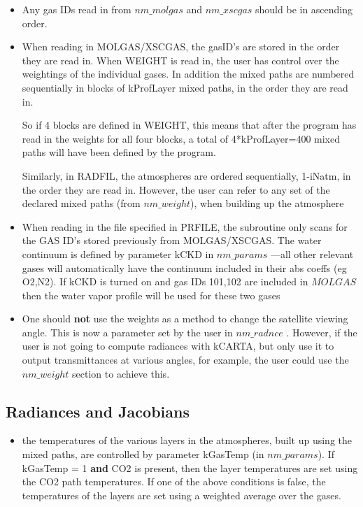 \documentclass[12pt]{article}
\newcommand{\kc}{\textsf{kCARTA}\xspace}
\begin{document}
{{{\begin{itemize}
\item Any gas IDs read in from $nm\_molgas$ and $nm\_xscgas$ should be in
  ascending order.
  
\item When reading in MOLGAS/XSCGAS, the gasID's are stored in the
  order they are read in.  When WEIGHT is read in, the user has
  control over the weightings of the individual gases.  In addition
  the mixed paths are numbered sequentially in blocks of
  kProfLayer mixed paths, in the order they are read in.  

  So if 4 blocks are defined in WEIGHT, this means that after the
  program has read in the weights for all four blocks, a total of
  4*kProfLayer=400 mixed paths will have been defined by the program.
  
  Similarly, in RADFIL, the atmospheres are ordered sequentially,
  1-{\sf iNatm}, in the order they are read in.  However, the user
  can refer to any set of the declared mixed paths (from $nm\_weight$),
  when building up the atmosphere
  
\item When reading in the file specified in PRFILE, the subroutine
  only scans for the GAS ID's stored previously from MOLGAS/XSCGAS.
  The water continuum is defined by parameter {\sf kCKD} in
  $nm\_params$ ---all other relevant gases will automatically have the
  continuum included in their abs coeffs (eg O2,N2). If {\sf kCKD} is turned 
  on and gas IDs 101,102 are included in $MOLGAS$ then the water vapor profile
  will be used for these two gases
  
\item One should {\bf not} use the weights as a method to change the
  satellite viewing angle.  This is now a parameter set by the user in
  $nm\_radnce$ .  However, if the user is not going to compute radiances with
  \kc, but only use it to output transmittances at various angles, for
  example, the user could use the $nm\_weight$  section to achieve this.

\end{itemize}

\subsection{Radiances and Jacobians}

\begin{itemize}
\item the temperatures of the various layers in the atmospheres, built
  up using the mixed paths, are controlled by parameter {\sf kGasTemp}
  (in $nm\_params$).  If {\sf kGasTemp} = 1 {\bf and} CO2 is present, then
  the layer temperatures are set using the CO2 path temperatures.  If
  one of the above conditions is false, the temperatures of the layers
  are set using a weighted average over the gases.
  

\end{itemize}}}}
\end{document}

